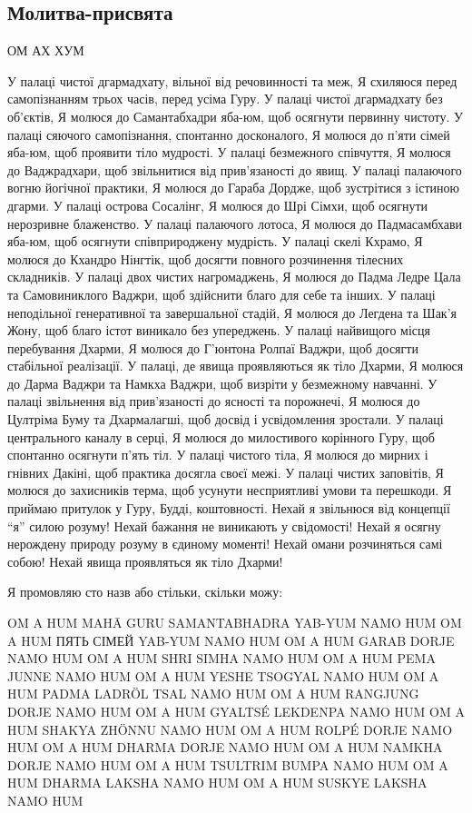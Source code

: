 \documentclass{article}
\begin{document}
\subsection{Молитва-присвята}

ОМ АХ ХУМ

У палаці чистої дгармадхату, вільної від речовинності та меж,
Я схиляюся перед самопізнанням трьох часів, перед усіма Гуру.
У палаці чистої дгармадхату без об’єктів,
Я молюся до Самантабхадри яба-юм, щоб осягнути первинну чистоту.
У палаці сяючого самопізнання, спонтанно досконалого,
Я молюся до п’яти сімей яба-юм, щоб проявити тіло мудрості.
У палаці безмежного співчуття,
Я молюся до Ваджрадхари, щоб звільнитися від прив’язаності до явищ.
У палаці палаючого вогню йогічної практики,
Я молюся до Гараба Дордже, щоб зустрітися з істиною дгарми.
У палаці острова Сосалінг,
Я молюся до Шрі Сімхи, щоб осягнути нерозривне блаженство.
У палаці палаючого лотоса,
Я молюся до Падмасамбхави яба-юм, щоб осягнути співприроджену мудрість.
У палаці скелі Кхрамо,
Я молюся до Кхандро Нінгтік, щоб досягти повного розчинення тілесних складників.
У палаці двох чистих нагромаджень,
Я молюся до Падма Ледре Цала та Самовиниклого Ваджри, щоб здійснити благо для себе та інших.
У палаці неподільної генеративної та завершальної стадій,
Я молюся до Легдена та Шак’я Жону, щоб благо істот виникало без упереджень.
У палаці найвищого місця перебування Дхарми,
Я молюся до Г’юнтона Ролпаї Ваджри, щоб досягти стабільної реалізації.
У палаці, де явища проявляються як тіло Дхарми,
Я молюся до Дарма Ваджри та Намкха Ваджри, щоб визріти у безмежному навчанні.
У палаці звільнення від прив’язаності до ясності та порожнечі,
Я молюся до Цултріма Буму та Дхармалагші, щоб досвід і усвідомлення зростали.
У палаці центрального каналу в серці,
Я молюся до милостивого корінного Гуру, щоб спонтанно осягнути п’ять тіл.
У палаці чистого тіла,
Я молюся до мирних і гнівних Дакіні, щоб практика досягла своєї межі.
У палаці чистих заповітів,
Я молюся до захисників терма, щоб усунути несприятливі умови та перешкоди.
Я приймаю притулок у Гуру, Будді, коштовності.
Нехай я звільнюся від концепції “я” силою розуму!
Нехай бажання не виникають у свідомості!
Нехай я осягну нерождену природу розуму в єдиному моменті!
Нехай омани розчиняться самі собою!
Нехай явища проявляться як тіло Дхарми!

Я промовляю сто назв або стільки, скільки можу:

OM A HUM MAHĀ GURU SAMANTABHADRA YAB-YUM NAMO HUM
OM A HUM ПЯТЬ СІМЕЙ YAB-YUM NAMO HUM
OM A HUM GARAB DORJE NAMO HUM
OM A HUM SHRI SIMHA NAMO HUM
OM A HUM PEMA JUNNE NAMO HUM
OM A HUM YESHE TSOGYAL NAMO HUM
OM A HUM PADMA LADRÖL TSAL NAMO HUM
OM A HUM RANGJUNG DORJE NAMO HUM
OM A HUM GYALTSÉ LEKDENPA NAMO HUM
OM A HUM SHAKYA ZHÖNNU NAMO HUM
OM A HUM ROLPÉ DORJE NAMO HUM
OM A HUM DHARMA DORJE NAMO HUM
OM A HUM NAMKHA DORJE NAMO HUM
OM A HUM TSULTRIM BUMPA NAMO HUM
OM A HUM DHARMA LAKSHA NAMO HUM
OM A HUM SUSKYE LAKSHA NAMO HUM
\end{document}

